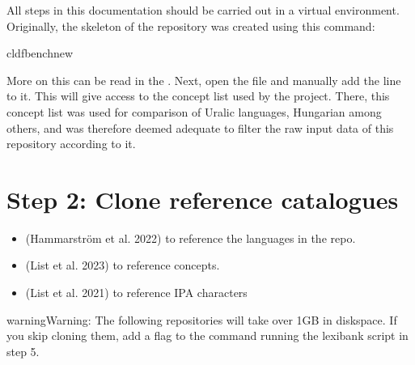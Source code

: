 \documentclass[letterpaper,10pt,english]{sphinxmanual}
\begin{document}
{{{{\sphinxAtStartPar
All steps in this documentation should be carried out in a virtual
environment. Originally, the skeleton of the repository was created using this
command:

\begin{sphinxVerbatim}[commandchars=\\\{\}]
cldfbenchnew
\end{sphinxVerbatim}

\sphinxAtStartPar
More on this can be read in the
.
Next, open the file  and manually add the line
 to it. This will give access to the
concept list used by the 
project. There, this concept list was used for comparison of Uralic languages,
Hungarian among others, and was therefore deemed adequate
to filter the raw input data of this repository according to it.


\section{Step 2: Clone reference catalogues}
\label{\detokenize{mkcldf:step-2-clone-reference-catalogues}}\begin{itemize}
\item {} 
\sphinxAtStartPar
{} (Hammarström et al. 2022)
to reference the languages in the repo.

\item {} 
\sphinxAtStartPar
{} (List et al. 2023) to
reference concepts.

\item {} 
\sphinxAtStartPar
{} (List et al. 2021) to reference IPA
characters

\end{itemize}

\begin{sphinxadmonition}{warning}{Warning:}
\sphinxAtStartPar
The following repositories will take over 1GB in disk\sphinxhyphen{}space. If you skip
cloning them,
add a  flag to the command running the lexibank script in step 5.
\end{sphinxadmonition}

}}}}
\end{document}
